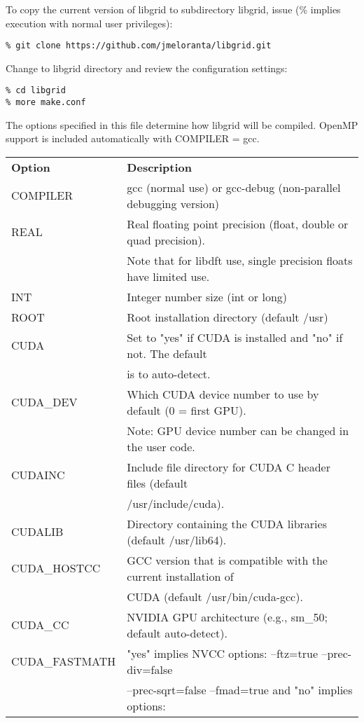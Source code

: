 \documentclass[12pt,letterpaper]{article}
\begin{document}
To copy the current version of libgrid to subdirectory libgrid, issue (\% implies execution with normal user privileges):
\begin{verbatim}
% git clone https://github.com/jmeloranta/libgrid.git
\end{verbatim}
Change to libgrid directory and review the configuration settings:
\begin{verbatim}
% cd libgrid
% more make.conf
\end{verbatim}
The options specified in this file determine how libgrid will be compiled. OpenMP support is included automatically with COMPILER = gcc.\\

\begin{tabular}{ll}
\textbf{Option} & \textbf{Description}\\
\cline{1-2}
COMPILER & gcc (normal use) or gcc-debug (non-parallel debugging version)\\
REAL & Real floating point precision (float, double or quad precision).\\
     & Note that for libdft use, single precision floats have limited use.\\
INT & Integer number size (int or long)\\
ROOT & Root installation directory (default /usr)\\
CUDA & Set to "yes" if CUDA is installed and "no" if not. The default\\
     & is to auto-detect.\\
CUDA\_DEV & Which CUDA device number to use by default (0 = first GPU).\\
          & Note: GPU device number can be changed in the user code.\\
CUDAINC & Include file directory for CUDA C header files (default\\
        & /usr/include/cuda).\\
CUDALIB & Directory containing the CUDA libraries (default /usr/lib64).\\
CUDA\_HOSTCC & GCC version that is compatible with the current installation of\\
             & CUDA (default /usr/bin/cuda-gcc).\\
CUDA\_CC & NVIDIA GPU architecture (e.g., sm\_50; default auto-detect).\\
CUDA\_FASTMATH & "yes" implies NVCC options: --ftz=true --prec-div=false\\
               & --prec-sqrt=false --fmad=true and "no" implies options:\\

\end{tabular}
\end{document}
